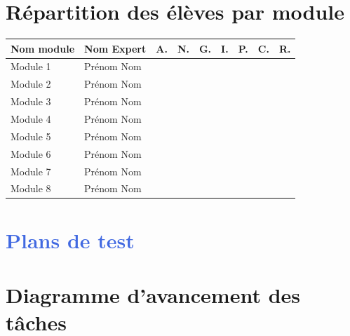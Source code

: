 \section{Répartition des élèves par module}
	\begin{tabular}{l|l|ccccccc}
		Nom module                   & Nom Expert & A. & N. & G. & I. & P. & C. & R. \\ %
		\hline
		Module 1 & Prénom Nom &    &\ct &    &    &    &    &\ct \\
		Module 2 & Prénom Nom &\ct &\ct &    &\ct &    &    &    \\
		Module 3 & Prénom Nom &\ct &    &\ct &    &    &    &    \\
		Module 4 & Prénom Nom &\ct &    &\ct &    &    &    &    \\
		Module 5 & Prénom Nom &    &    &    &    &    &\ct &    \\
		Module 6 & Prénom Nom &    &    &\ct &\ct &    &    &    \\
		Module 7 & Prénom Nom &    &    &    &    &\ct &\ct &    \\
		Module 8 & Prénom Nom &    &    &    &    &\ct &    &\ct
	\end{tabular}


\section{\textcolor{RoyalBlue}{Plans de test}}

	


\section{Diagramme d’avancement des tâches}

	